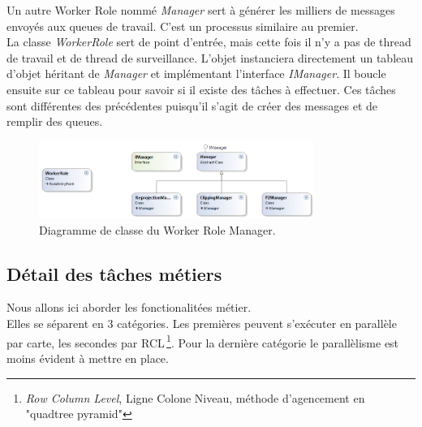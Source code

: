 Un autre Worker Role nommé \textit{Manager} sert à générer les
milliers de messages envoyés aux queues de travail. C'est un processus
similaire au premier. \\

La classe \textit{WorkerRole} sert de point d'entrée, mais cette fois
il n'y a pas de thread de travail et de thread de
surveillance. L'objet instanciera directement un tableau d'objet
héritant de \textit{Manager} et implémentant l'interface
\textit{IManager}. Il boucle ensuite sur ce tableau pour savoir si il
existe des tâches à effectuer. Ces tâches sont différentes des
précédentes puisqu'il s'agit de créer des messages et de remplir des
queues.

\begin{figure}[h!]
  \caption{Diagramme de classe du Worker Role Manager.}
  \centering
    \includegraphics[width=0.8\textwidth]{images/Manager.png}
\end{figure}









%
%

\subsection{Détail des tâches métiers}
Nous allons ici aborder les fonctionalitées métier. \\ Elles se
séparent en 3 catégories. Les premières peuvent s'exécuter en
parallèle par carte, les secondes par RCL\,\footnote{\textit{Row
    Column Level}, Ligne Colone Niveau, méthode d'agencement en
  "quadtree pyramid"}. Pour la dernière catégorie le parallèlisme est
moins évident à mettre en place. \\



